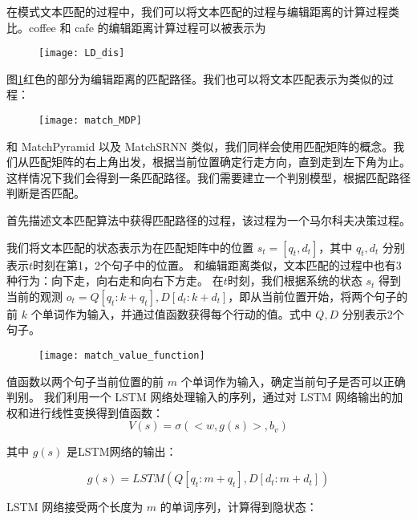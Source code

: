 在模式文本匹配的过程中，我们可以将文本匹配的过程与编辑距离\cite{website:edit_dis}的计算过程类比。coffee 和 cafe 的编辑距离计算过程可以被表示为

\begin{figure}[H]
    \centering
    \texttt{[image: LD\_dis]}
    \label{fig:LD_dis}
\end{figure}

图\ref{fig:LD_dis}红色的部分为编辑距离的匹配路径。我们也可以将文本匹配表示为类似的过程：

\begin{figure}[!htbp]
    \centering
    \texttt{[image: match\_MDP]}
    \label{fig:match_MDP}
\end{figure}

和 MatchPyramid 以及 MatchSRNN 类似，我们同样会使用匹配矩阵的概念。我们从匹配矩阵的右上角出发，根据当前位置确定行走方向，直到走到左下角为止。这样情况下我们会得到一条匹配路径。我们需要建立一个判别模型，根据匹配路径判断是否匹配。

首先描述文本匹配算法中获得匹配路径的过程，该过程为一个马尔科夫决策过程。

我们将文本匹配的状态表示为在匹配矩阵中的位置 $s_t = [q_{t}, d_{t}]$，其中 $q_{t}, d_{t}$ 分别表示$t$时刻在第1，2个句子中的位置。
和编辑距离类似，文本匹配的过程中也有3种行为：向下走，向右走和向右下方走。
在$t$时刻，我们根据系统的状态 $s_t$ 得到当前的观测 $o_t = Q [q_{t}:k+q_{t}], D [d_{t}:k+d_{t}]$，即从当前位置开始，将两个句子的前 $k$ 个单词作为输入，并通过值函数获得每个行动的值。式中 $Q, D$ 分别表示2个句子。

\begin{figure}[!htbp]
    \centering
    \texttt{[image: match\_value\_function]}
    \label{fig:value_function_input}
\end{figure}

值函数以两个句子当前位置的前 $m$ 个单词作为输入，确定当前句子是否可以正确判别。
我们利用一个 LSTM 网络处理输入的序列，通过对 LSTM 网络输出的加权和进行线性变换得到值函数：
$$
V(s) = \sigma(<w, g(s)>, b_v)
$$

其中 $g(s)$ 是LSTM网络的输出：

$$
g(s) = LSTM(Q[q_{t}:m+q_{t}], D [d_{t}:m+d_{t}])
$$

LSTM 网络接受两个长度为 $m$ 的单词序列，计算得到隐状态：

